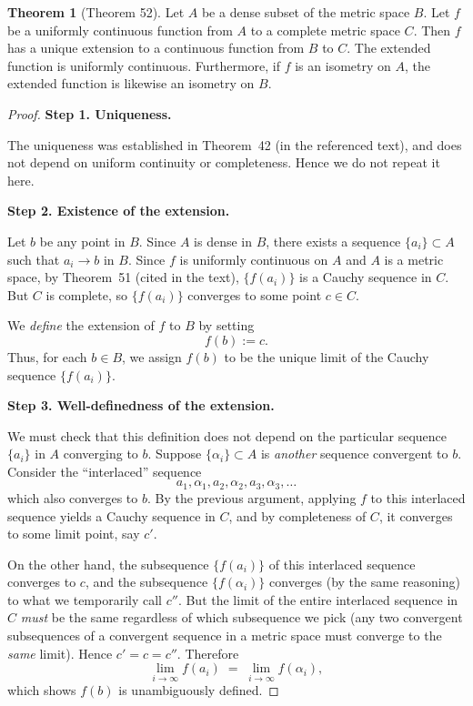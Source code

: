 \documentclass[12pt]{article}
\title{}
\author{Jerich Lee}
\date{\today}
\theoremstyle{definition} %
\newtheorem{theorem}{Theorem}
\theoremstyle{plain} %
\begin{document}
\maketitle
\begin{theorem}[Theorem 52]
    Let $A$ be a dense subset of the metric space $B$. Let $f$ be a uniformly continuous function from $A$ to a complete metric space $C$. Then $f$ has a unique extension to a continuous function from $B$ to $C$. The extended function is uniformly continuous. Furthermore, if $f$ is an isometry on $A$, the extended function is likewise an isometry on $B$.
    \end{theorem}
    
    \begin{proof}
    \textbf{Step 1. Uniqueness.}
    
    The uniqueness was established in Theorem~42 (in the referenced text), and does not depend on uniform continuity or completeness. Hence we do not repeat it here.
    
    \medskip
    
    \textbf{Step 2. Existence of the extension.}
    
    Let $b$ be any point in $B$. Since $A$ is dense in $B$, there exists a sequence $\{a_i\} \subset A$ such that $a_i \to b$ in $B$. Since $f$ is uniformly continuous on $A$ and $A$ is a metric space, by Theorem~51 (cited in the text), $\{f(a_i)\}$ is a Cauchy sequence in $C$. But $C$ is complete, so $\{f(a_i)\}$ converges to some point $c \in C$. 
    
    We \emph{define} the extension of $f$ to $B$ by setting
    \[
    f(b) := c.
    \]
    Thus, for each $b \in B$, we assign $f(b)$ to be the unique limit of the Cauchy sequence $\{f(a_i)\}$. 
    
    \medskip
    
    \textbf{Step 3. Well-definedness of the extension.}
    
    We must check that this definition does not depend on the particular sequence $\{a_i\}$ in $A$ converging to $b$. Suppose $\{\alpha_i\} \subset A$ is \emph{another} sequence convergent to $b$. Consider the ``interlaced'' sequence
    \[
    a_1, \alpha_1, a_2, \alpha_2, a_3, \alpha_3, \dots
    \]
    which also converges to $b$. By the previous argument, applying $f$ to this interlaced sequence yields a Cauchy sequence in $C$, and by completeness of $C$, it converges to some limit point, say $c'$. 
    
    On the other hand, the subsequence $\{f(a_i)\}$ of this interlaced sequence converges to $c$, and the subsequence $\{f(\alpha_i)\}$ converges (by the same reasoning) to what we temporarily call $c''$. But the limit of the entire interlaced sequence in $C$ \emph{must} be the same regardless of which subsequence we pick (any two convergent subsequences of a convergent sequence in a metric space must converge to the \emph{same} limit). Hence $c' = c = c''$. Therefore
    \[
    \lim_{i \to \infty} f(a_i) \;=\; \lim_{i \to \infty} f(\alpha_i),
    \]
    which shows $f(b)$ is unambiguously defined. 
    

\end{proof}
\end{document}
